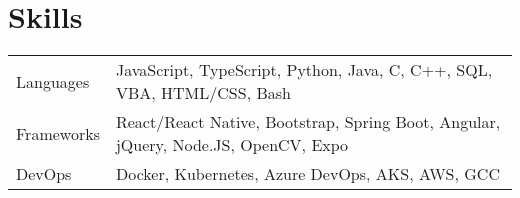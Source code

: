 \documentclass[a4paper,11pt]{article}
\begin{document}
\section{Skills}
\begin{tabularx}{\linewidth}{@{}l X@{}}
Languages &  \normalsize{JavaScript, TypeScript, Python, Java, C, C++, SQL, VBA, HTML/CSS, Bash}\\
Frameworks  &  \normalsize{React/React Native, Bootstrap, Spring Boot, Angular, jQuery, Node.JS, OpenCV, Expo}\\ 
DevOps  &  \normalsize{Docker, Kubernetes, Azure DevOps, AKS, AWS, GCC}\\
\end{tabularx}

\vfill
\end{document}
